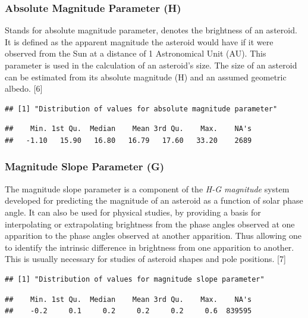 \documentclass[
]{article}
\begin{document}
\hypertarget{absolute-magnitude-parameter-h}{%
\subsubsection{Absolute Magnitude Parameter
(H)}\label{absolute-magnitude-parameter-h}}

Stands for absolute magnitude parameter, denotes the brightness of an
asteroid. It is defined as the apparent magnitude the asteroid would
have if it were observed from the Sun at a distance of 1 Astronomical
Unit (AU). This parameter is used in the calculation of an asteroid's
size. The size of an asteroid can be estimated from its absolute
magnitude (H) and an assumed geometric albedo. {[}6{]}

\begin{verbatim}
## [1] "Distribution of values for absolute magnitude parameter"
\end{verbatim}

\begin{verbatim}
##    Min. 1st Qu.  Median    Mean 3rd Qu.    Max.    NA's 
##   -1.10   15.90   16.80   16.79   17.60   33.20    2689
\end{verbatim}

\hypertarget{magnitude-slope-parameter-g}{%
\subsubsection{Magnitude Slope Parameter
(G)}\label{magnitude-slope-parameter-g}}

The magnitude slope parameter is a component of the \emph{H-G magnitude}
system developed for predicting the magnitude of an asteroid as a
function of solar phase angle. It can also be used for physical studies,
by providing a basis for interpolating or extrapolating brightness from
the phase angles observed at one apparition to the phase angles observed
at another apparition. Thus allowing one to identify the intrinsic
difference in brightness from one apparition to another. This is usually
necessary for studies of asteroid shapes and pole positions. {[}7{]}

\begin{verbatim}
## [1] "Distribution of values for magnitude slope parameter"
\end{verbatim}

\begin{verbatim}
##    Min. 1st Qu.  Median    Mean 3rd Qu.    Max.    NA's 
##    -0.2     0.1     0.2     0.2     0.2     0.6  839595
\end{verbatim}
\end{document}
